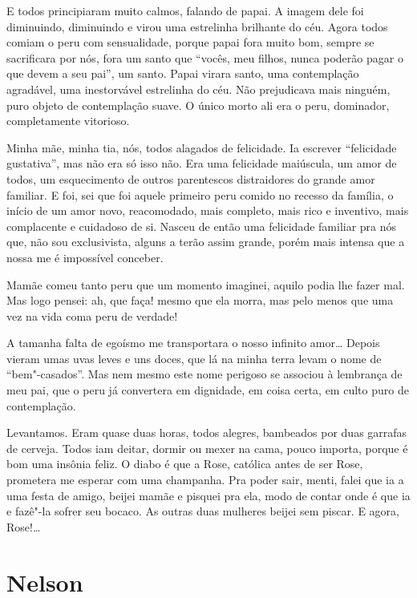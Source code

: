 \begin{linenumbers}
E todos principiaram muito calmos, falando de papai. A imagem dele foi
diminuindo, diminuindo e virou uma estrelinha brilhante do céu. Agora
todos comiam o peru com sensualidade, porque papai fora muito bom,
sempre se sacrificara por nós, fora um santo que ``vocês, meu filhos,
nunca poderão pagar o que devem a seu pai'', um santo. Papai virara
santo, uma contemplação agradável, uma inestorvável estrelinha do céu.
Não prejudicava mais ninguém, puro objeto de contemplação suave. O único
morto ali era o peru, dominador, completamente vitorioso.

Minha mãe, minha tia, nós, todos alagados de felicidade. Ia escrever
``felicidade gustativa'', mas não era só isso não. Era uma felicidade
maiúscula, um amor de todos, um esquecimento de outros parentescos
distraidores do grande amor familiar. E foi, sei que foi aquele primeiro
peru comido no recesso da família, o início de um amor novo,
reacomodado, mais completo, mais rico e inventivo, mais complacente e
cuidadoso de si. Nasceu de então uma felicidade familiar pra nós que,
não sou exclusivista, alguns a terão assim grande, porém mais intensa
que a nossa me é impossível conceber.

Mamãe comeu tanto peru que um momento imaginei, aquilo podia lhe fazer
mal. Mas logo pensei: ah, que faça! mesmo que ela morra, mas pelo menos
que uma vez na vida coma peru de verdade!

A tamanha falta de egoísmo me transportara o nosso infinito amor\ldots{}
Depois vieram umas uvas leves e uns doces, que lá na minha terra levam o
nome de ``bem"-casados''. Mas nem mesmo este nome perigoso se associou à
lembrança de meu pai, que o peru já convertera em dignidade, em coisa
certa, em culto puro de contemplação.

Levantamos. Eram quase duas horas, todos alegres, bambeados por duas
garrafas de cerveja. Todos iam deitar, dormir ou mexer na cama, pouco
importa, porque é bom uma insônia feliz. O diabo é que a Rose, católica
antes de ser Rose, prometera me esperar com uma champanha. Pra poder
sair, menti, falei que ia a uma festa de amigo, beijei mamãe e pisquei
pra ela, modo de contar onde é que ia e fazê"-la sofrer seu bocaco. As
outras duas mulheres beijei sem piscar. E agora, Rose!\ldots{}
\end{linenumbers}

\chapter{Nelson}

